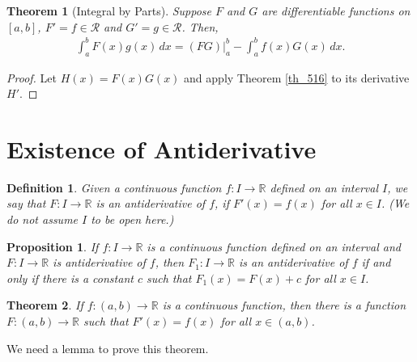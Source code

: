 \documentclass[11pt]{book}
\newtheorem{definition}{Definition}[chapter]
\newtheorem{theorem}{Theorem}[chapter]
\newtheorem{proposition}{Proposition}[chapter]
\theoremstyle{definition}
\numberwithin{equation}{chapter}
\begin{document}
\medskip

\begin{theorem}[Integral by Parts]
Suppose $F$ and $G$ are differentiable functions on $[a,b]$, $F' = f \in \mathscr{R}$ and $G' = g \in \mathscr{R}$. Then,
\begin{align*}
    \int^b_a F(x)g(x) \,dx = (FG)\bigg|^b_a - \int^b_a f(x)G(x) \,dx.
\end{align*}
\end{theorem}
\begin{proof}
Let $H(x) = F(x)G(x)$ and apply Theorem \ref{th_516} to its derivative $H'$.
\end{proof}

\medskip






\section{Existence of Antiderivative}

\begin{definition}
Given a continuous function $f: I \to \mathbb{R}$ defined on an interval $I$, we say that $F: I \to \mathbb{R}$ is an antiderivative of $f$, if $F'(x) = f(x)$ for all $x \in I$. (We do not assume $I$ to be open here.)
\end{definition}

\medskip

\begin{proposition}
If $f: I \to \mathbb{R}$ is a continuous function defined on an interval and $F: I \to \mathbb{R}$ is antiderivative of $f$, then $F_1: I \to \mathbb{R}$ is an antiderivative of $f$ if and only if there is a constant $c$ such that $F_1(x) = F(x) + c$ for all $x \in I$.
\end{proposition}

\medskip

\begin{theorem}\label{th_518}
If $f: (a,b) \to \mathbb{R}$ is a continuous function, then there is a function $F: (a,b) \to \mathbb{R}$ such that $F'(x) = f(x)$ for all $x \in (a,b)$.
\end{theorem}

\medskip

We need a lemma to prove this theorem.

\medskip
\end{document}

